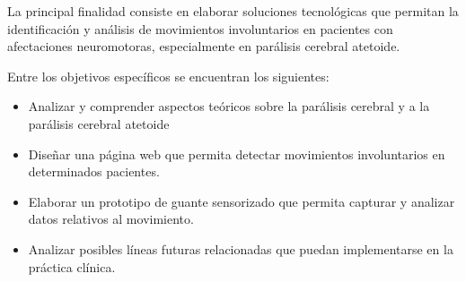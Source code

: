 
La principal finalidad consiste en elaborar soluciones tecnológicas que permitan la identificación y análisis de movimientos involuntarios en pacientes con afectaciones neuromotoras, especialmente en parálisis cerebral atetoide. 

Entre los objetivos específicos se encuentran los siguientes: 
\begin{itemize}
    \item Analizar y comprender aspectos teóricos sobre la parálisis cerebral y a la parálisis cerebral atetoide 
    \item Diseñar una página web que permita detectar movimientos involuntarios en determinados pacientes. 
    \item Elaborar un prototipo de guante sensorizado que permita capturar y analizar datos relativos al movimiento. 
    \item Analizar posibles líneas futuras relacionadas que puedan implementarse en la práctica clínica. 
\end{itemize}









